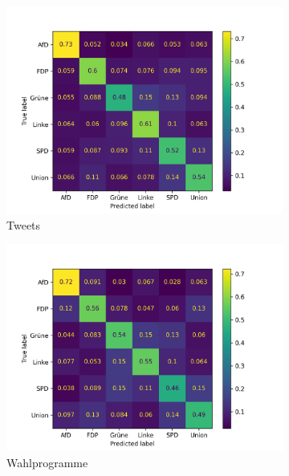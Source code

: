 \begin{figure}[H]
    \centering
    \begin{subfigure}{0.49\textwidth}
      \includegraphics[width=\textwidth]{data/images/modeling/fasttext/under/tweets_confusion_matrix.png}
      \caption{Tweets} \label{sfig:confusionMatrixFastTextTweets}
    \end{subfigure}
    \hfill
    \begin{subfigure}{0.49\textwidth}
      \includegraphics[width=\textwidth]{data/images/modeling/fasttext/under/party_programs_confusion_matrix.png}
      \caption{Wahlprogramme} \label{sfig:confusionMatrixFastTextManifest}
    \end{subfigure}
    \hfill
    \begin{subfigure}{0.49\textwidth}

\end{subfigure}
\end{figure}
